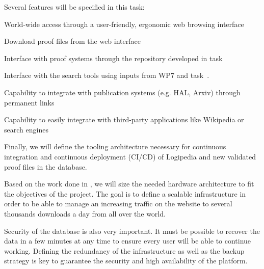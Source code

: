 \begin{workpackage}[id=access,type=RTD,wphases=1-48,
  short=Access,%
  title={Access},
  lead=Inr,InrRM=48,OcaRM=6,EduRM=12]
\begin{tasklist}
{\begin{task}[id=archi,
      title=Defining the functional and software architecture,
      lead=Inr,InrRM=3,wphases=2-5]
    Several features will be specified in this task:
    \begin{compactitem}
    \item World-wide access through a user-friendly, ergonomic web
      browsing interface
    \item Download proof files from the web interface
    \item Interface with proof systems through the repository developed
      in task~
    \item Interface with the search tools using inputs from WP7 and
      task~.
    \item Capability to integrate with publication systems (e.g. HAL,
      Arxiv) through permanent links
    \item Capability to easily integrate with third-party applications
      like Wikipedia or search engines
    \end{compactitem}

    Finally, we will define the tooling architecture necessary for
    continuous integration and continuous deployment (CI/CD) of
    Logipedia and new validated proof files in the database.
  \end{task}

  \begin{task}[id=infra,
      title=Defining the hardware architecture for the infrastructure,
      lead=Inr,InrRM=1,wphases=6-7]
    Based on the work done in , we will
    size the needed hardware architecture to fit the objectives of the
    project. The goal is to define a scalable infrastructure in order
    to be able to manage an increasing traffic on the website to
    several thousands downloads a day from all over the world.

    Security of the database is also very important. It must be
    possible to recover the data in a few minutes at any time to
    ensure every user will be able to continue working. Defining the
    redundancy of the infrastructure as well as the backup strategy is
    key to guarantee the security and high availability of the
    platform.


\end{task}}
\end{tasklist}
\end{workpackage}
